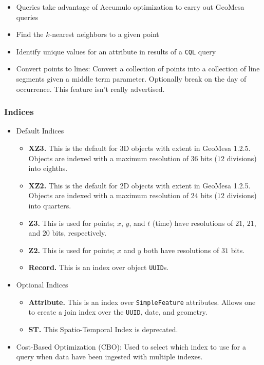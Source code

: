 \begin{itemize}
{\begin{itemize}
{    return the members of the former set which lie within the (specified) proximity of members of the latter set.
  }
  \item Queries take advantage of Accumulo optimization to carry out GeoMesa queries
  \item Find the $k$-nearest neighbors to a given point
  \item Identify unique values for an attribute in results of a \texttt{CQL} query
  \item{
    Convert points to lines: Convert a collection of points into a collection of line segments given a middle term parameter.
    Optionally break on the day of occurrence. This feature isn't really advertised.
  }
  \end{itemize}
}
\end{itemize}

  
\subsubsection*{Indices}

\begin{itemize}
\item{Default Indices
  \begin{itemize}
  \item{
    {\bf XZ3.}
    This is the default for 3D objects with extent in GeoMesa 1.2.5.
    Objects are indexed with a maximum resolution of $36$ bits ($12$ divisions) into eighths.
  }
  \item{
    {\bf XZ2.}
    This is the default for 2D objects with extent in GeoMesa 1.2.5.
    Objects are indexed with a maximum resolution of $24$ bits ($12$ divisions) into quarters.
  }
  \item{
    {\bf Z3.}
    This is used for points; $x$, $y$, and $t$ (time) have resolutions of $21$, $21$, and $20$ bits, respectively.
  }
  \item{
    {\bf Z2.}
    This is used for points; $x$ and $y$ both have resolutions of $31$ bits.
  }
  \item{
    {\bf Record.}
    This is an index over object \texttt{UUID}s.
  }
  \end{itemize}
}
\item{Optional Indices
  \begin{itemize}
  \item{
    {\bf Attribute.}
    This is an index over \texttt{SimpleFeature} attributes.
    Allows one to create a join index over the \texttt{UUID}, date, and geometry.
  }
  \item{{\bf ST.}  This Spatio-Temporal Index is deprecated.}
  \end{itemize}
}
\item Cost-Based Optimization (CBO): Used to select which index to use for a query when data have been ingested with multiple indexes.
\end{itemize}


